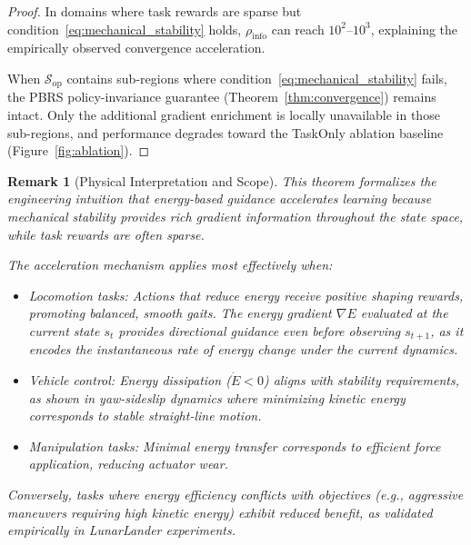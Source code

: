 \documentclass[journal]{IEEEtran}
\newtheorem*{remark}{Remark}
\begin{document}
\begin{proof}
		In domains where task rewards are sparse but condition~\eqref{eq:mechanical_stability} holds, $\rho_{\text{info}}$ can reach $10^2$--$10^3$, explaining the empirically observed convergence acceleration.
		
		When $\mathcal{S}_{\text{op}}$ contains sub-regions where condition~\eqref{eq:mechanical_stability} fails, the PBRS policy-invariance guarantee (Theorem~\ref{thm:convergence}) remains intact. Only the additional gradient enrichment is locally unavailable in those sub-regions, and performance degrades toward the TaskOnly ablation baseline (Figure~\ref{fig:ablation}).
	\end{proof}
	
	\begin{remark}[Physical Interpretation and Scope]
		This theorem formalizes the engineering intuition that \textit{energy-based guidance accelerates learning because mechanical stability provides rich gradient information throughout the state space, while task rewards are often sparse}.
		
		The acceleration mechanism applies most effectively when:
		\begin{itemize}
			\item Locomotion tasks: Actions that reduce energy receive positive shaping rewards, promoting balanced, smooth gaits. The energy gradient $\nabla E$ evaluated at the current state $s_t$ provides directional guidance even before observing $s_{t+1}$, as it encodes the instantaneous rate of energy change under the current dynamics.
			\item Vehicle control: Energy dissipation ($\dot{E}<0$) aligns with stability requirements, as shown in yaw-sideslip dynamics where minimizing kinetic energy corresponds to stable straight-line motion.
			\item Manipulation tasks: Minimal energy transfer corresponds to efficient force application, reducing actuator wear.
		\end{itemize}
		
		Conversely, tasks where energy efficiency conflicts with objectives (e.g., aggressive maneuvers requiring high kinetic energy) exhibit reduced benefit, as validated empirically in LunarLander experiments.
	\end{remark}
	
\end{document}
